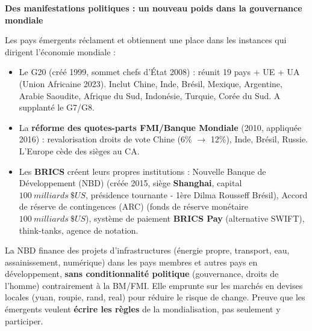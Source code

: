 \documentclass[11pt]{article}
\newcommand{\cle}[1]{{\popxbold\color{popdark}#1}}
\begin{document}
\textbf{Des manifestations politiques : un nouveau poids dans la gouvernance mondiale}\par

Les pays émergents réclament et obtiennent une place dans les instances qui dirigent l'économie mondiale :
\begin{itemize}
\item Le \cle{G20} (créé 1999, sommet chefs d'État 2008) : réunit 19 pays + UE + UA (Union Africaine 2023). Inclut Chine, Inde, Brésil, Mexique, Argentine, Arabie Saoudite, Afrique du Sud, Indonésie, Turquie, Corée du Sud. A supplanté le G7/G8.
\item La \textbf{réforme des quotes-parts FMI/Banque Mondiale} (2010, appliquée 2016) : revalorisation droits de vote Chine (6\% $\to$ 12\%), Inde, Brésil, Russie. L'Europe cède des sièges au CA.
\item Les \textbf{BRICS} créent leurs propres institutions : \cle{Nouvelle Banque de Développement (NBD)} (créée 2015, siège \textbf{Shanghai}, capital $\SI{100}{milliards}\ \$US$, présidence tournante - 1ère Dilma Rousseff Brésil), \cle{Accord de réserve de contingences (ARC)} (fonds de réserve monétaire $\SI{100}{milliards}\ \$US$), système de paiement \textbf{BRICS Pay} (alternative SWIFT), think-tanks, agence de notation.
\end{itemize}

\begin{savaistu}
La NBD finance des projets d'infrastructures (énergie propre, transport, eau, assainissement, numérique) dans les pays membres et autres pays en développement, \textbf{sans conditionnalité politique} (gouvernance, droits de l'homme) contrairement à la BM/FMI. Elle emprunte sur les marchés en devises locales (yuan, roupie, rand, real) pour réduire le risque de change. Preuve que les émergents veulent \textbf{écrire les règles} de la mondialisation, pas seulement y participer.
\end{savaistu}
\end{document}
